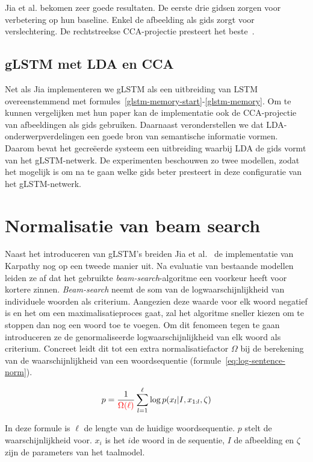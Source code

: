 Jia et al. bekomen zeer goede resultaten. De eerste drie gidsen zorgen voor verbetering op hun baseline. Enkel de afbeelding als gids zorgt voor verslechtering. De rechtstreekse CCA-projectie presteert het beste~\cite{Fernando2015}.

\subsection{gLSTM met LDA en CCA}
Net als Jia implementeren we gLSTM als een uitbreiding van LSTM overeenstemmend met formules~\eqref{glstm-memory-start}-\eqref{glstm-memory}.
Om te kunnen vergelijken met hun paper kan de implementatie ook de CCA-projectie van afbeeldingen als gids gebruiken.
Daarnaast veronderstellen we dat LDA-onderwerpverdelingen een goede bron van semantische informatie vormen. Daarom bevat het gecre\"eerde systeem een uitbreiding waarbij LDA de gids vormt van het gLSTM-netwerk.
De experimenten beschouwen zo twee modellen, zodat het mogelijk is om na te gaan welke gids beter presteert in deze configuratie van het gLSTM-netwerk.

\section{Normalisatie van beam search}
Naast het introduceren van gLSTM's breiden Jia et al.~\cite{Fernando2015} de implementatie van Karpathy nog op een tweede manier uit. Na evaluatie van bestaande modellen leiden ze af dat het gebruikte \emph{beam-search}-algoritme een voorkeur heeft voor kortere zinnen. \emph{Beam-search} neemt de som van de logwaarschijnlijkheid van individuele woorden als criterium. Aangezien deze waarde voor elk woord negatief is en het om een maximalisatieproces gaat, zal het algoritme sneller kiezen om te stoppen dan nog een woord toe te voegen. Om dit fenomeen tegen te gaan introduceren ze de genormaliseerde logwaarschijnlijkheid van elk woord als criterium. Concreet leidt dit tot een extra normalisatiefactor $\Omega$ bij de berekening van de waarschijnlijkheid van een woordsequentie (formule~\eqref{eq:log-sentence-norm}).

\begin{equation}
p = \frac{1}{\color{red}{\Omega(\ell)}}\sum_{l=1}^{\ell} \log p(x_l | I, x_{1:l}, \zeta)
\label{eq:log-sentence-norm}
\end{equation}

In deze formule is $\ell$ de lengte van de huidige woordsequentie. $p$ stelt de waarschijnlijkheid voor. $x_i$ is het $i$de woord in de sequentie, $I$ de afbeelding en $\zeta$ zijn de parameters van het taalmodel. 

